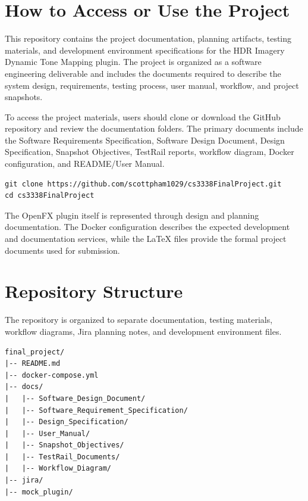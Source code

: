 \documentclass[11pt]{article}
\begin{document}

\section{How to Access or Use the Project}

This repository contains the project documentation, planning artifacts, testing materials, and development environment specifications for the HDR Imagery Dynamic Tone Mapping plugin. The project is organized as a software engineering deliverable and includes the documents required to describe the system design, requirements, testing process, user manual, workflow, and project snapshots.

To access the project materials, users should clone or download the GitHub repository and review the documentation folders. The primary documents include the Software Requirements Specification, Software Design Document, Design Specification, Snapshot Objectives, TestRail reports, workflow diagram, Docker configuration, and README/User Manual.

\begin{verbatim}
git clone https://github.com/scottpham1029/cs3338FinalProject.git
cd cs3338FinalProject
\end{verbatim}

The OpenFX plugin itself is represented through design and planning documentation. The Docker configuration describes the expected development and documentation services, while the LaTeX files provide the formal project documents used for submission.


\section{Repository Structure}

The repository is organized to separate documentation, testing materials, workflow diagrams, Jira planning notes, and development environment files.

\begin{verbatim}
final_project/
|-- README.md
|-- docker-compose.yml
|-- docs/
|   |-- Software_Design_Document/
|   |-- Software_Requirement_Specification/
|   |-- Design_Specification/
|   |-- User_Manual/
|   |-- Snapshot_Objectives/
|   |-- TestRail_Documents/
|   |-- Workflow_Diagram/
|-- jira/
|-- mock_plugin/
\end{verbatim}
\end{document}
